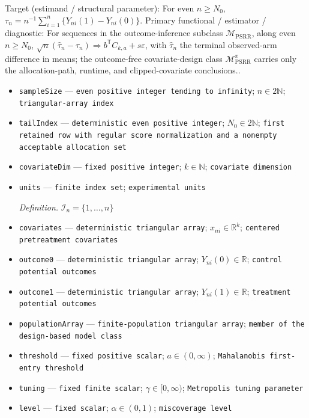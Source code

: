 \documentclass{article}
\begin{document}
Target (estimand / structural parameter): For even \(n\ge N_0\), \(\tau_n=n^{-1}\sum_{i=1}^n\{Y_{ni}(1)-Y_{ni}(0)\}\).
Primary functional / estimator / diagnostic: For sequences in the outcome-inference subclass \(\mathcal M_{\mathrm{PSRR}}\), along even \(n\ge N_0\), \(\sqrt n(\widehat\tau_n-\tau_n)\Rightarrow b^{\mathsf T}C_{k,a}+s\varepsilon\), with \(\widehat\tau_n\) the terminal observed-arm difference in means; the outcome-free covariate-design class \(\mathcal M_{\mathrm{PSRR}}^x\) carries only the allocation-path, runtime, and clipped-covariate conclusions..
\begin{itemize}
  \item \texttt{sampleSize} --- \texttt{even positive integer tending to infinity}; \(n\in 2\mathbb N\); \texttt{triangular-\allowbreak{}array index}
  \item \texttt{tailIndex} --- \texttt{deterministic even positive integer}; \(N_0\in 2\mathbb N\); \texttt{first retained row with regular score normalization and a nonempty acceptable allocation set}
  \item \texttt{covariateDim} --- \texttt{fixed positive integer}; \(k\in\mathbb N\); \texttt{covariate dimension}
  \item \texttt{units} --- \texttt{finite index set}; \texttt{experimental units}
  \par\smallskip\noindent\emph{Definition.} \(\mathcal I_n=\{1,\ldots,n\}\)
  \item \texttt{covariates} --- \texttt{deterministic triangular array}; \(x_{ni}\in\mathbb R^k\); \texttt{centered pretreatment covariates}
  \item \texttt{outcome0} --- \texttt{deterministic triangular array}; \(Y_{ni}(0)\in\mathbb R\); \texttt{control potential outcomes}
  \item \texttt{outcome1} --- \texttt{deterministic triangular array}; \(Y_{ni}(1)\in\mathbb R\); \texttt{treatment potential outcomes}
  \item \texttt{populationArray} --- \texttt{finite-\allowbreak{}population triangular array}; \texttt{member of the design-\allowbreak{}based model class}
  \item \texttt{threshold} --- \texttt{fixed positive scalar}; \(a\in(0,\infty)\); \texttt{Mahalanobis first-\allowbreak{}entry threshold}
  \item \texttt{tuning} --- \texttt{fixed finite scalar}; \(\gamma\in[0,\infty)\); \texttt{Metropolis tuning parameter}
  \item \texttt{level} --- \texttt{fixed scalar}; \(\alpha\in(0,1)\); \texttt{miscoverage level}

\end{itemize}
\end{document}
